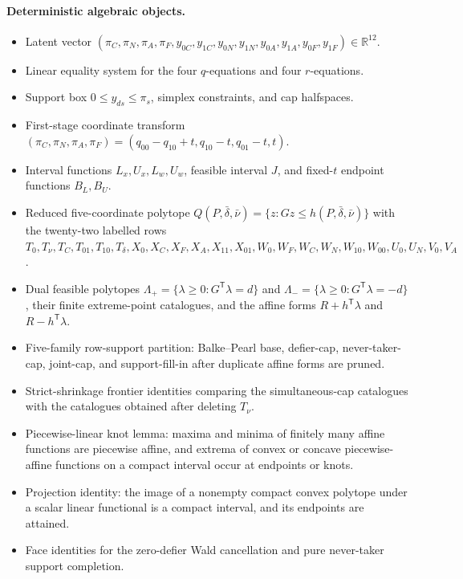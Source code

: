 \documentclass[11pt]{article}
\newcommand{\transpose}{\mathsf{T}}
\newcommand{\R}{\mathbb{R}}
\theoremstyle{definition}
\theoremstyle{plain}
\theoremstyle{remark}
\begin{document}
\paragraph{Deterministic algebraic objects.}
\begin{itemize}[leftmargin=*]
\item Latent vector
\((\pi_C,\pi_N,\pi_A,\pi_F,y_{0C},y_{1C},y_{0N},y_{1N},
y_{0A},y_{1A},y_{0F},y_{1F})\in\R^{12}\).
\item Linear equality system for the four \(q\)-equations and four
\(r\)-equations.
\item Support box \(0\le y_{ds}\le\pi_s\), simplex constraints, and cap
halfspaces.
\item First-stage coordinate transform
\((\pi_C,\pi_N,\pi_A,\pi_F)=(q_{00}-q_{10}+t,q_{10}-t,q_{01}-t,t)\).
\item Interval functions \(L_x,U_x,L_w,U_w\), feasible interval \(J\), and
fixed-\(t\) endpoint functions \(B_L,B_U\).
\item Reduced five-coordinate polytope
\(Q(P,\bar\delta,\bar\nu)=\{z:Gz\le h(P,\bar\delta,\bar\nu)\}\) with the
twenty-two labelled rows \(T_0,T_\nu,T_C,T_{01},T_{10},T_\delta,X_0,X_C,
X_F,X_A,X_{11},X_{01},W_0,W_F,W_C,W_N,W_{10},W_{00},U_0,U_N,V_0,V_A\).
\item Dual feasible polytopes
\(\Lambda_+=\{\lambda\ge0:G^{\transpose}\lambda=d\}\) and
\(\Lambda_-=\{\lambda\ge0:G^{\transpose}\lambda=-d\}\), their finite
extreme-point catalogues, and the affine forms
\(R+h^{\transpose}\lambda\) and \(R-h^{\transpose}\lambda\).
\item Five-family row-support partition: Balke--Pearl base, defier-cap,
never-taker-cap, joint-cap, and support-fill-in after duplicate affine forms
are pruned.
\item Strict-shrinkage frontier identities comparing the simultaneous-cap
catalogues with the catalogues obtained after deleting \(T_\nu\).
\item Piecewise-linear knot lemma: maxima and minima of finitely many affine
functions are piecewise affine, and extrema of convex or concave
piecewise-affine functions on a compact interval occur at endpoints or knots.
\item Projection identity: the image of a nonempty compact convex polytope
under a scalar linear functional is a compact interval, and its endpoints are
attained.
\item Face identities for the zero-defier Wald cancellation and pure
never-taker support completion.
\end{itemize}
\end{document}
